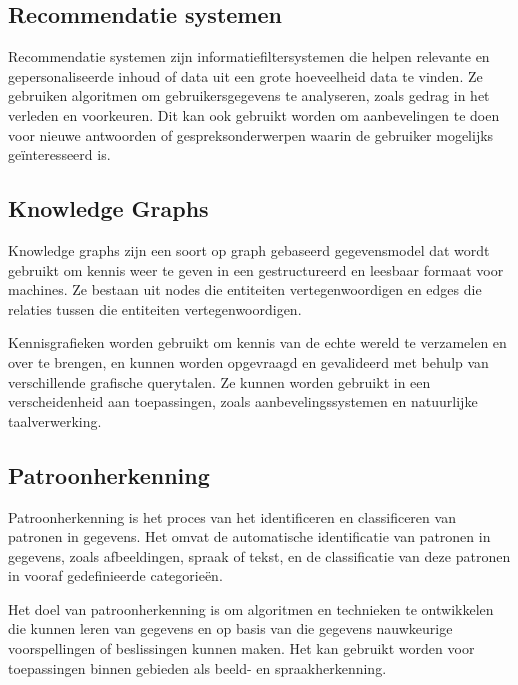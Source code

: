 \cite{buchanan1988fundamentals}

\subsection{Recommendatie systemen}

Recommendatie systemen zijn informatiefiltersystemen die helpen relevante en gepersonaliseerde inhoud of data uit een grote hoeveelheid data te vinden. Ze gebruiken algoritmen om gebruikersgegevens te analyseren, zoals gedrag in het verleden en voorkeuren. Dit kan ook gebruikt worden om aanbevelingen te doen voor nieuwe antwoorden of gespreksonderwerpen waarin de gebruiker mogelijks geïnteresseerd is.

\cite{isinkaye2015recommendation}

\subsection{Knowledge Graphs}

Knowledge graphs zijn een soort op graph gebaseerd gegevensmodel dat wordt gebruikt om kennis weer te geven in een gestructureerd en leesbaar formaat voor machines. Ze bestaan uit nodes die entiteiten vertegenwoordigen en edges die relaties tussen die entiteiten vertegenwoordigen. 

Kennisgrafieken worden gebruikt om kennis van de echte wereld te verzamelen en over te brengen, en kunnen worden opgevraagd en gevalideerd met behulp van verschillende grafische querytalen. Ze kunnen worden gebruikt in een verscheidenheid aan toepassingen, zoals aanbevelingssystemen en natuurlijke taalverwerking.

\cite{hogan2021knowledge}

\subsection{Patroonherkenning}

Patroonherkenning is het proces van het identificeren en classificeren van patronen in gegevens. Het omvat de automatische identificatie van patronen in gegevens, zoals afbeeldingen, spraak of tekst, en de classificatie van deze patronen in vooraf gedefinieerde categorieën. 

Het doel van patroonherkenning is om algoritmen en technieken te ontwikkelen die kunnen leren van gegevens en op basis van die gegevens nauwkeurige voorspellingen of beslissingen kunnen maken. Het kan gebruikt worden voor toepassingen binnen gebieden als beeld- en spraakherkenning.

